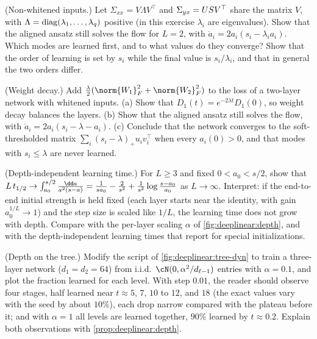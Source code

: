 \begin{refsection}
\begin{exercises}
\item \variation (Non-whitened inputs.) Let $\Sigma_{xx}=V\Lambda V^\top$ and $\Sigma_{yx}=USV^\top$ share the matrix $V$, with $\Lambda=\operatorname{diag}(\lambda_1,\dots,\lambda_q)$ positive (in this exercise $\lambda_i$ are eigenvalues). Show that the aligned ansatz still solves the flow for $L=2$, with $\dot a_i=2a_i(s_i-\lambda_ia_i)$. Which modes are learned first, and to what values do they converge? Show that the order of learning is set by $s_i$ while the final value is $s_i/\lambda_i$, and that in general the two orders differ.\label{ex:deeplinear:nonwhite}

\item \variation (Weight decay.) Add $\frac\lambda2(\norm{W_1}_F^2+\norm{W_2}_F^2)$ to the loss of a two-layer network with whitened inputs. (a) Show that $D_1(t)=e^{-2\lambda t}D_1(0)$, so weight decay balances the layers. (b) Show that the aligned ansatz still solves the flow, with $\dot a_i=2a_i(s_i-\lambda-a_i)$. (c) Conclude that the network converges to the soft-thresholded matrix $\sum_i(s_i-\lambda)_+u_iv_i^\top$ when every $a_i(0)>0$, and that modes with $s_i\le\lambda$ are never learned.\label{ex:deeplinear:wd}

\item \variation\hard (Depth-independent learning time.) For $L\ge3$ and fixed $0<a_0<s/2$, show that $L\,\dlhalf\to\int_{a_0}^{s/2}\frac{\dd a}{a^2(s-a)}=\frac1{sa_0}-\frac2{s^2}+\frac1{s^2}\log\frac{s-a_0}{a_0}$ as $L\to\infty$. Interpret: if the end-to-end initial strength is held fixed (each layer starts near the identity, with gain $a_0^{1/L}\to1$) and the step size is scaled like $1/L$, the learning time does not grow with depth. Compare with the per-layer scaling $\alpha$ of \cref{fig:deeplinear:depth}, and with the depth-independent learning times that \textcite{SaxeEtAl2014} report for special initializations. \label{ex:deeplinear:deep}

\item \simulation (Depth on the tree.) Modify the script of \cref{fig:deeplinear:tree-dyn} to train a three-layer network ($d_1=d_2=64$) from i.i.d.\ $\cN(0,\alpha^2/d_{\ell-1})$ entries with $\alpha=0.1$, and plot the fraction learned for each level. With step $0.01$, the reader should observe four stages, half learned near $t\approx5$, $7$, $10$ to $12$, and $18$ (the exact values vary with the seed by about $10\%$), each drop narrow compared with the plateau before it; and with $\alpha=1$ all levels are learned together, $90\%$ learned by $t\approx0.2$. Explain both observations with \cref{prop:deeplinear:depth}.\label{ex:deeplinear:sim-depth}


\end{exercises}
\end{refsection}
